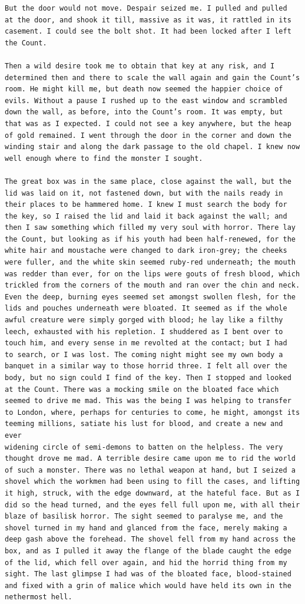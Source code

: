 \documentclass{article}
\begin{document}
\begin{verbatim}
But the door would not move. Despair seized me. I pulled and pulled
at the door, and shook it till, massive as it was, it rattled in its
casement. I could see the bolt shot. It had been locked after I left
the Count.

Then a wild desire took me to obtain that key at any risk, and I
determined then and there to scale the wall again and gain the Count’s
room. He might kill me, but death now seemed the happier choice of
evils. Without a pause I rushed up to the east window and scrambled
down the wall, as before, into the Count’s room. It was empty, but
that was as I expected. I could not see a key anywhere, but the heap
of gold remained. I went through the door in the corner and down the
winding stair and along the dark passage to the old chapel. I knew now
well enough where to find the monster I sought.

The great box was in the same place, close against the wall, but the
lid was laid on it, not fastened down, but with the nails ready in
their places to be hammered home. I knew I must search the body for
the key, so I raised the lid and laid it back against the wall; and
then I saw something which filled my very soul with horror. There lay
the Count, but looking as if his youth had been half-renewed, for the
white hair and moustache were changed to dark iron-grey; the cheeks
were fuller, and the white skin seemed ruby-red underneath; the mouth
was redder than ever, for on the lips were gouts of fresh blood, which
trickled from the corners of the mouth and ran over the chin and neck.
Even the deep, burning eyes seemed set amongst swollen flesh, for the
lids and pouches underneath were bloated. It seemed as if the whole
awful creature were simply gorged with blood; he lay like a filthy
leech, exhausted with his repletion. I shuddered as I bent over to
touch him, and every sense in me revolted at the contact; but I had
to search, or I was lost. The coming night might see my own body a
banquet in a similar way to those horrid three. I felt all over the
body, but no sign could I find of the key. Then I stopped and looked
at the Count. There was a mocking smile on the bloated face which
seemed to drive me mad. This was the being I was helping to transfer
to London, where, perhaps for centuries to come, he might, amongst its
teeming millions, satiate his lust for blood, and create a new and ever
widening circle of semi-demons to batten on the helpless. The very
thought drove me mad. A terrible desire came upon me to rid the world
of such a monster. There was no lethal weapon at hand, but I seized a
shovel which the workmen had been using to fill the cases, and lifting
it high, struck, with the edge downward, at the hateful face. But as I
did so the head turned, and the eyes fell full upon me, with all their
blaze of basilisk horror. The sight seemed to paralyse me, and the
shovel turned in my hand and glanced from the face, merely making a
deep gash above the forehead. The shovel fell from my hand across the
box, and as I pulled it away the flange of the blade caught the edge
of the lid, which fell over again, and hid the horrid thing from my
sight. The last glimpse I had was of the bloated face, blood-stained
and fixed with a grin of malice which would have held its own in the
nethermost hell.


\end{verbatim}
\end{document}
